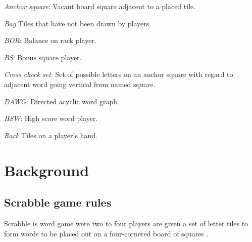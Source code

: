 \documentclass[a4paper, 12pt]{report}
\begin{document}
\begin{description}
\item{\emph{Anchor square}}: Vacant board square adjacent to a placed tile.

\item{\emph{Bag}} Tiles that have not been drawn by players.

\item{\emph{BOR}}: Balance on rack player.

\item{\emph{BS}}: Bonus square player.

\item{\emph{Cross check set}}: Set of possible letters on an anchor square with regard to adjacent word going vertical from named square.

\item{\emph{DAWG}}: Directed acyclic word graph.

\item{\emph{HSW}}: High score word player.

\item{\emph{Rack}} Tiles on a player's hand. 

\end{description}







\chapter{Background}

\section{Scrabble game rules}
Scrabble is word game were two to four players are given a set of letter tiles to form words to be placed out on a four-cornered board of squares \cite{ABSP} \cite{NASPA} \cite{forbund}.
\end{document}

